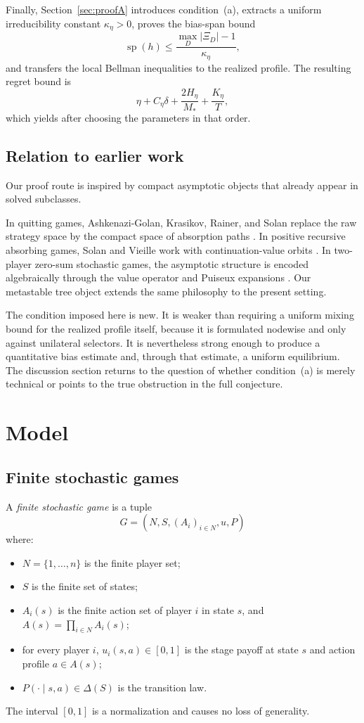 \documentclass[12pt]{article}
\theoremstyle{definition}
\newcommand{\1}{\mathbf{1}}
\DeclareMathOperator{\spn}{sp}
\begin{document}
Finally, Section~\ref{sec:proofA} introduces condition~(a), extracts a uniform
irreducibility constant $\kappa_\eta>0$, proves the bias-span bound
\[
\spn(h)\le \frac{\max_D|\Xi_D|-1}{\kappa_\eta},
\]
and transfers the local Bellman inequalities to the realized profile.  The resulting
regret bound is
\[
\eta + C_\eta\delta + \frac{2H_\eta}{M_*} + \frac{K_\eta}{T},
\]
which yields  after choosing the parameters in that order.

\subsection{Relation to earlier work}

Our proof route is inspired by compact asymptotic objects that already appear in solved
subclasses.

In quitting games, Ashkenazi-Golan, Krasikov, Rainer, and Solan replace the raw strategy
space by the compact space of absorption paths \cite{AshkenaziGolanKrasikovRainerSolan2024}.
In positive recursive absorbing games, Solan and Vieille work with continuation-value
orbits \cite{SolanVieille2025}.  In two-player zero-sum stochastic games, the asymptotic
structure is encoded algebraically through the value operator and Puiseux expansions
\cite{BewleyKohlberg1976,MertensNeyman1981}.  Our metastable tree object extends the same
philosophy to the present setting.

The condition imposed here is new.  It is weaker than requiring a uniform mixing bound for
the realized profile itself, because it is formulated nodewise and only against unilateral
selectors.  It is nevertheless strong enough to produce a quantitative bias estimate and,
through that estimate, a uniform equilibrium.  The discussion section returns to the
question of whether condition~(a) is merely technical or points to the true obstruction in
the full conjecture.

\section{Model}
\label{sec:model}

\subsection{Finite stochastic games}

A \emph{finite stochastic game} is a tuple
\[
G=(N,S,(A_i)_{i\in N},u,P)
\]
where:
\begin{itemize}[leftmargin=2em]
\item \(N=\{1,\dots,n\}\) is the finite player set;
\item \(S\) is the finite set of states;
\item \(A_i(s)\) is the finite action set of player \(i\) in state \(s\), and
\(A(s)=\prod_{i\in N}A_i(s)\);
\item for every player \(i\), \(u_i(s,a)\in[0,1]\) is the stage payoff at state \(s\)
and action profile \(a\in A(s)\);
\item \(P(\cdot\mid s,a)\in\Delta(S)\) is the transition law.
\end{itemize}
The interval \([0,1]\) is a normalization and causes no loss of generality.
\end{document}
